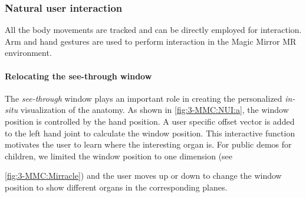 {{\subsubsection{Natural user interaction}
All the body movements are tracked and can be directly employed for interaction. Arm and hand gestures are used to perform interaction in the Magic Mirror MR environment.

\paragraph{Relocating the see-through window}
The \textit{see-through} window plays an important role in creating the personalized \textit{in-situ} visualization of the anatomy.
As shown in \figurename{\ref{fig:3-MMC:NUI:a}}, the window position is controlled by the hand position. A user specific offset vector is added to the left hand joint to calculate the window position. This interactive function motivates the user to learn where the interesting organ is. For public demos for children, we limited the window position to one dimension (see \figurename{\ref{fig:3-MMC:Mirracle}) and the user moves up or down to change the window position to show different organs in the corresponding planes.
	
}}}
